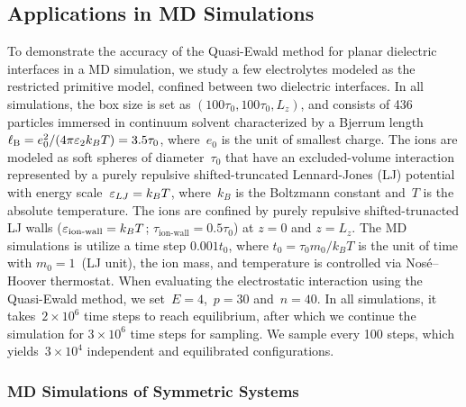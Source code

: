 \subsection{Applications in MD Simulations}

To demonstrate the accuracy of the Quasi-Ewald method for planar dielectric interfaces in a MD simulation, we study a few electrolytes modeled as the restricted primitive model, confined between two dielectric interfaces.
In all simulations, the box size is set as $(100 \tau_0, 100\tau_0, L_z)$, and consists of 436 particles immersed in continuum solvent characterized by a Bjerrum length $\ell_{\mathrm B} = e_0^2/(4 \pi \varepsilon_2 k_B T) = 3.5 \tau_0$, where~$e_0$ is the unit of smallest charge.
The ions are modeled as soft spheres of diameter~$\tau_0$ that have an excluded-volume interaction represented by a purely repulsive shifted-truncated Lennard-Jones (LJ) potential with energy scale~$\varepsilon_{LJ} = k_B T$, where~$k_B$ is the Boltzmann constant and~$T$ is the absolute temperature.
The ions are confined by purely repulsive shifted-trunacted LJ walls ($\varepsilon_\text{ion-wall} = k_B T$; $\tau_\text{ion-wall} = 0.5 \tau_0$) at $z = 0$ and $z = L_z$. 
The MD simulations is utilize a time step $0.001 t_0$, where $t_0 = \tau_0 m_0 / k_B T$ is the unit of time with $m_0 = 1$~(LJ unit), the ion mass, and temperature is controlled via Nosé–Hoover thermostat.
When evaluating the electrostatic interaction using the Quasi-Ewald method, we set~$E = 4$,~$p = 30$ and~$n = 40$.
In all simulations, it takes~$2 \times 10^6$ time steps to reach equilibrium, after which we continue the simulation for $3 \times 10^6$ time steps for sampling.
We sample every 100 steps, which yields~$3 \times 10^{4}$ independent and equilibrated configurations.

\subsubsection{MD Simulations of Symmetric Systems}

